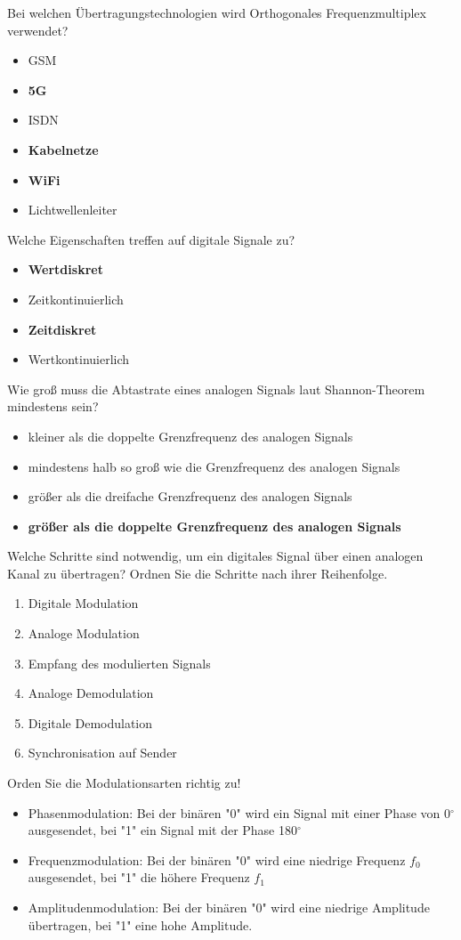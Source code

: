 \documentclass{article}
\begin{document}
	Bei welchen Übertragungstechnologien wird Orthogonales Frequenzmultiplex verwendet?
	\begin{itemize}
		\item GSM
		\item \textbf{5G}
		\item ISDN
		\item \textbf{Kabelnetze}
		\item \textbf{WiFi}
		\item Lichtwellenleiter
	\end{itemize}

	Welche Eigenschaften treffen auf digitale Signale zu? 
	\begin{itemize}
		\item \textbf{Wertdiskret}
		\item Zeitkontinuierlich
		\item \textbf{Zeitdiskret}
		\item Wertkontinuierlich
	\end{itemize}

	Wie groß muss die Abtastrate eines analogen Signals laut Shannon-Theorem mindestens sein?
	\begin{itemize}
		\item kleiner als die doppelte Grenzfrequenz des analogen Signals 
		\item mindestens halb so groß wie die Grenzfrequenz des analogen Signals
		\item größer als die dreifache Grenzfrequenz des analogen Signals
		\item \textbf{größer als die doppelte Grenzfrequenz des analogen Signals }
	\end{itemize}

	Welche Schritte sind notwendig, um ein digitales Signal über einen analogen Kanal zu übertragen? Ordnen Sie die Schritte nach ihrer Reihenfolge.
	\begin{enumerate}
		\item Digitale Modulation
		\item Analoge Modulation
		\item Empfang des modulierten Signals
		\item Analoge Demodulation
		\item Digitale Demodulation
		\item Synchronisation auf Sender
	\end{enumerate}

	Orden Sie die Modulationsarten richtig zu! 
	\begin{itemize}
		\item Phasenmodulation: Bei der binären "0" wird ein Signal mit einer Phase von 0$^\circ$ ausgesendet, bei "1" ein Signal mit der Phase 180$^\circ$
		\item Frequenzmodulation: Bei der binären "0" wird eine niedrige Frequenz $f_0$ ausgesendet, bei "1" die höhere Frequenz $f_1$
		\item Amplitudenmodulation: Bei der binären "0" wird eine niedrige Amplitude übertragen, bei "1" eine hohe Amplitude. 
	\end{itemize}
	
\end{document}
